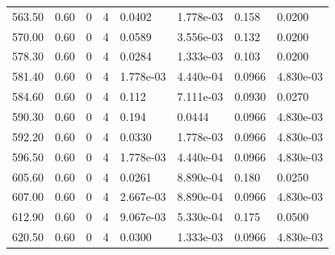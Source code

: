 \documentclass[preview]{standalone}
\begin{document}
{{{{\begin{tabular}{L{1.2cm}C{1.2cm} C{0.3cm}C{0.5cm} C{1.4cm}C{1.4cm} C{1.4cm}C{1.4cm}}
  563.50  &  0.60  & 0     &  4 &  0.0402  & 1.778e-03  & 0.158 &  0.0200   \\ 
  570.00  &  0.60  & 0     &  4 &  0.0589  & 3.556e-03  & 0.132 &  0.0200   \\ 
  578.30  &  0.60  & 0     &  4 &  0.0284  & 1.333e-03  & 0.103 &  0.0200   \\ 
  581.40  &  0.60  & 0     &  4 &  1.778e-03  & 4.440e-04  & 0.0966 &  4.830e-03   \\ 
  584.60  &  0.60  & 0     &  4 &  0.112  & 7.111e-03  & 0.0930 &  0.0270   \\ 
  590.30  &  0.60  & 0     &  4 &  0.194  & 0.0444  & 0.0966 &  4.830e-03   \\ 
  592.20  &  0.60  & 0     &  4 &  0.0330  & 1.778e-03  & 0.0966 &  4.830e-03   \\ 
  596.50  &  0.60  & 0     &  4 &  1.778e-03  & 4.440e-04  & 0.0966 &  4.830e-03   \\ 
  605.60  &  0.60  & 0     &  4 &  0.0261  & 8.890e-04  & 0.180 &  0.0250   \\ 
  607.00  &  0.60  & 0     &  4 &  2.667e-03  & 8.890e-04  & 0.0966 &  4.830e-03   \\ 
  612.90  &  0.60  & 0     &  4 &  9.067e-03  & 5.330e-04  & 0.175 &  0.0500   \\ 
  620.50  &  0.60  & 0     &  4 &  0.0300  & 1.333e-03  & 0.0966 &  4.830e-03   \\ 
\hline 
\end{tabular} 

}}}}
\end{document}
